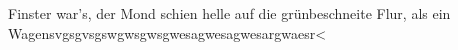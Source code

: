 \documentclass[11pt]{scrartcl}
\begin{document}
 
Finster war's, der Mond schien helle auf die grünbeschneite Flur, als
ein Wagensvgsgvsgswgwsgwsgwesagwesagwesargwaesr<
 
\end{document}
